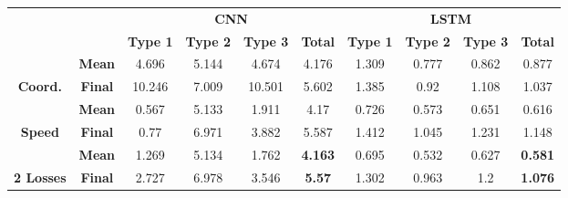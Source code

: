 \documentclass[a0,portrait]{a0poster}
\begin{document}
\begin{multicols}{2}
\begin{itemize}
\end{itemize}
\fontsize{7pt}{8.2}\selectfont
\begin{table}[]
\centering
\begin{tabular}{cc|c|c|c|c|c|c|c|c|}
\cline{3-10}
\multicolumn{1}{l}{}                                     &                & \multicolumn{4}{c|}{\textbf{CNN}}                                    & \multicolumn{4}{c|}{\textbf{LSTM}}                                                          \\ \cline{3-10} 
                                                         &                & \textbf{Type 1} & \textbf{Type 2} & \textbf{Type 3} & \textbf{Total} & \textbf{Type 1} & \textbf{Type 2} & \textbf{Type 3} & \textbf{Total}                        \\ \hline
\multicolumn{1}{|c|}{}                                   & \textbf{Mean}  &4.696                 & 5.144                &4.674                 &4.176                & 1.309            & 0.777           & 0.862           & 0.877                                 \\ \cline{2-10} 
\multicolumn{1}{|c|}{\multirow{-2}{*}{\textbf{Coord.}}} & \textbf{Final} &10.246                 & 7.009                &10.501                 &5.602                & 1.385           & 0.92           & 1.108           & 1.037                                \\ \hline
\multicolumn{1}{|c|}{}                                   & \textbf{Mean}  &0.567                 &5.133                 &1.911                 &4.17                & 0.726           & 0.573           & 0.651           & 0.616 \\ \cline{2-10} 
\multicolumn{1}{|c|}{\multirow{-2}{*}{\textbf{Speed}}} & \textbf{Final} &0.77                 &6.971                 &3.882                 &5.587                & 1.412           & 1.045           & 1.231           & 1.148 \\ \hline
\multicolumn{1}{|c|}{}                                   & \textbf{Mean}  &1.269      &5.134                 &1.762                 &{\color[HTML]{FE0000} \textbf{4.163}}                & 0.695           & 0.532           & 0.627           &  {\color[HTML]{FE0000} \textbf{0.581}}                                 \\ \cline{2-10} 
\multicolumn{1}{|c|}{\multirow{-2}{*}{\textbf{2 Losses}}} & \textbf{Final} &2.727                 &6.978                 &3.546                 &{\color[HTML]{FE0000} \textbf{5.57}}                & 1.302           & 0.963           & 1.2           &  {\color[HTML]{FE0000} \textbf{1.076}}                                 \\ \hline

\end{tabular}
\end{table}
\end{multicols}
\end{document}
